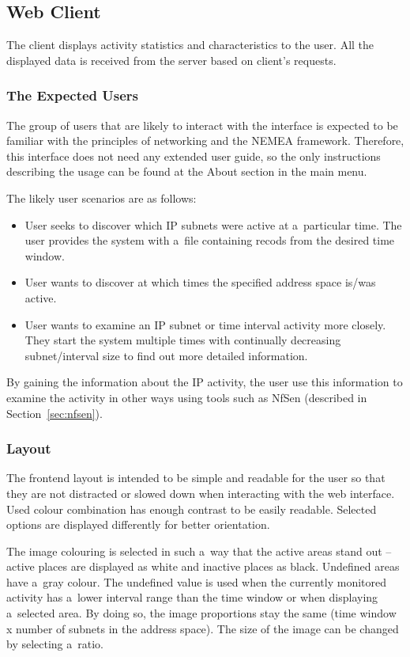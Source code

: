 \subsection{Web Client}\label{sec:client_design}
The client displays activity statistics and characteristics to the user. All the
displayed data is received from the server based on client's requests. 

\subsubsection{The Expected Users}
The group of users that are likely to interact with the interface is
expected to be familiar with the principles of networking and the NEMEA framework.
Therefore, this interface does not need any extended user guide, so the only
instructions describing the usage can be found at the About
section in the main menu.

The likely user scenarios are as follows:

\begin{itemize}
   \item User seeks to discover which IP subnets were active at a~particular time.
         The user provides the system with a~file containing recods from the desired time window.
   \item User wants to discover at which times the specified address space is/was active.
   \item User wants to examine an IP subnet or time interval activity more closely. They start the system
         multiple times with continually decreasing subnet/interval size to find out more detailed information.
\end{itemize}

By gaining the information about the IP activity, the user use this information to
examine the activity in other ways using tools such as NfSen (described in Section~\ref{sec:nfsen}).

\subsubsection{Layout}
The frontend layout is intended to be simple and readable for the user so that they are not
distracted or slowed down when interacting with the web interface. Used colour
combination has enough contrast to be easily readable. 
Selected options are displayed differently for better orientation.

The image colouring is selected in such a~way that the active areas stand out --
active places are displayed as white and inactive places as black. Undefined
areas have a~gray colour. The undefined value is used when the currently monitored
activity has a~lower interval range than the time window or when displaying
a~selected area. By doing so, the image proportions stay the same
(time window x number of subnets in the address space). The size of the image can be
changed by selecting a~ratio.

